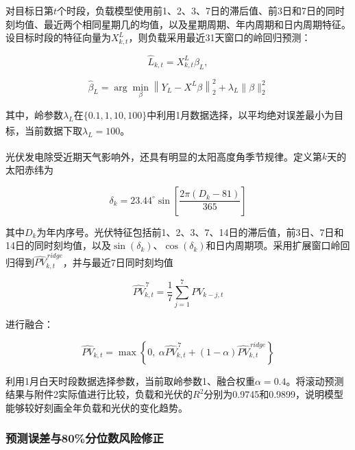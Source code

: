 \documentclass[UTF8]{ctexart}
\let\oldcite\cite
\renewcommand{\cite}[1]{\textsuperscript{\oldcite{#1}}}
\begin{document}
    对目标日第$t$个时段，负载模型使用前1、2、3、7日的滞后值、前3日和7日的同时刻均值、最近两个相同星期几的均值，以及星期周期、年内周期和日内周期特征。设目标时段的特征向量为$X^L_{k,t}$，则负载采用最近31天窗口的岭回归预测：
    
    \begin{equation}
        \widehat L_{k,t}=X^L_{k,t}\beta_L,
    \end{equation}
    
    \begin{equation}
        \widehat\beta_L
        =\arg\min_{\beta}
        \left\|
        Y_L-X^L\beta
        \right\|_2^2
        +\lambda_L\|\beta\|_2^2
    \end{equation}
    
    其中，岭参数$\lambda_L$在$\{0.1,1,10,100\}$中利用1月数据选择，以平均绝对误差最小为目标，当前数据下取$\lambda_L=100$\cite{Hoerl01021970}。\par
    
    光伏发电除受近期天气影响外，还具有明显的太阳高度角季节规律\cite{ANTONANZAS201678}。定义第$k$天的太阳赤纬为
    
    \begin{equation}
        \delta_k
        =23.44^\circ
        \sin\left[
        \frac{2\pi(D_k-81)}{365}
        \right]
    \end{equation}
    
    其中$D_k$为年内序号。光伏特征包括前1、2、3、7、14日的滞后值，前3日、7日和14日的同时刻均值，以及$\sin(\delta_k)$、$\cos(\delta_k)$和日内周期项。采用扩展窗口岭回归得到$\widehat{PV}^{\,ridge}_{k,t}$，并与最近7日同时刻均值
    
    \begin{equation}
        \widehat{PV}^{\,7}_{k,t}
        =\frac{1}{7}\sum_{j=1}^{7}PV_{k-j,t}
    \end{equation}
    
    进行融合：
    
    \begin{equation}
        \widehat{PV}_{k,t}
        =\max\left\{
        0,\ 
        \alpha\widehat{PV}^{\,7}_{k,t}
        +(1-\alpha)\widehat{PV}^{\,ridge}_{k,t}
        \right\}
    \end{equation}
    
    利用1月白天时段数据选择参数，当前取岭参数1、融合权重$\alpha=0.4$。将滚动预测结果与附件2实际值进行比较，负载和光伏的$R^2$分别为0.9745和0.9899，说明模型能够较好刻画全年负载和光伏的变化趋势。
    
    \subsubsection{预测误差与80\%分位数风险修正}
    
\end{document}
